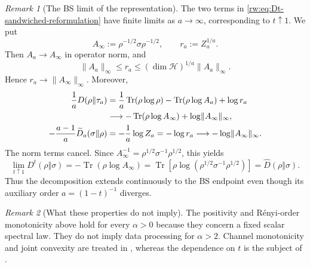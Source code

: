 \documentclass[11pt]{article}
\theoremstyle{remark}
\newtheorem{remark}[remark]{Remark}
\newcommand{\1}{\mathbbm{1}}
\begin{document}
\begin{remark}[The BS limit of the representation]
\label{rw:rem:Dt-sandwiched-BS-limit}
The two terms in \eqref{rw:eq:Dt-sandwiched-reformulation} have
finite limits as $a\to\infty$, corresponding to $t\uparrow1$.  We put
\begin{equation}
 A_\infty:=\rho^{-1/2}\sigma\rho^{-1/2},
 \qquad
 r_a:=Z_a^{1/a}.
\end{equation}
Then $A_a\to A_\infty$ in operator norm, and
\begin{equation}
 \lVert A_a\rVert_\infty
 \leq r_a
 \leq(\dim\mathcal H)^{1/a}\lVert A_a\rVert_\infty.
 \label{rw:eq:sandwiched-radius-squeeze}
\end{equation}
Hence $r_a\to\lVert A_\infty\rVert_\infty$.  Moreover,
\begin{align}
 \frac1aD(\rho\Vert\tau_a)
 &=\frac1a\operatorname{Tr}(\rho\log\rho)
   -\operatorname{Tr}(\rho\log A_a)+\log r_a
 \notag\\
 &\longrightarrow
 -\operatorname{Tr}(\rho\log A_\infty)
 +\log\lVert A_\infty\rVert_\infty,
 \label{rw:eq:sandwiched-first-term-limit}\\
 -\frac{a-1}{a}\widetilde D_a(\sigma\Vert\rho)
 &=-\frac1a\log Z_a=-\log r_a
 \longrightarrow-\log\lVert A_\infty\rVert_\infty.
 \label{rw:eq:sandwiched-second-term-limit}
\end{align}
The norm terms cancel.  Since
$A_\infty^{-1}=\rho^{1/2}\sigma^{-1}\rho^{1/2}$, this yields
\begin{equation}
 \lim_{t\uparrow1}D^t(\rho\Vert\sigma)
 =-\operatorname{Tr}(\rho\log A_\infty)
 =\operatorname{Tr}\!\left[
   \rho\log(\rho^{1/2}\sigma^{-1}\rho^{1/2})\right]
 =\widehat D(\rho\Vert\sigma).
 \label{rw:eq:sandwiched-representation-BS-limit}
\end{equation}
Thus the decomposition extends continuously to the BS endpoint even
though its auxiliary order $a=(1-t)^{-1}$ diverges.
\end{remark}

\begin{remark}[What these properties do not imply]
\label{rw:rem:basic-properties-scope}
The positivity and R\'enyi-order monotonicity above hold for every
$\alpha>0$ because they concern a fixed scalar spectral law.  They do
not imply data processing for $\alpha>2$.  Channel monotonicity and
joint convexity are treated in ,
whereas the dependence on $t$ is the subject of
.
\end{remark}
\end{document}

